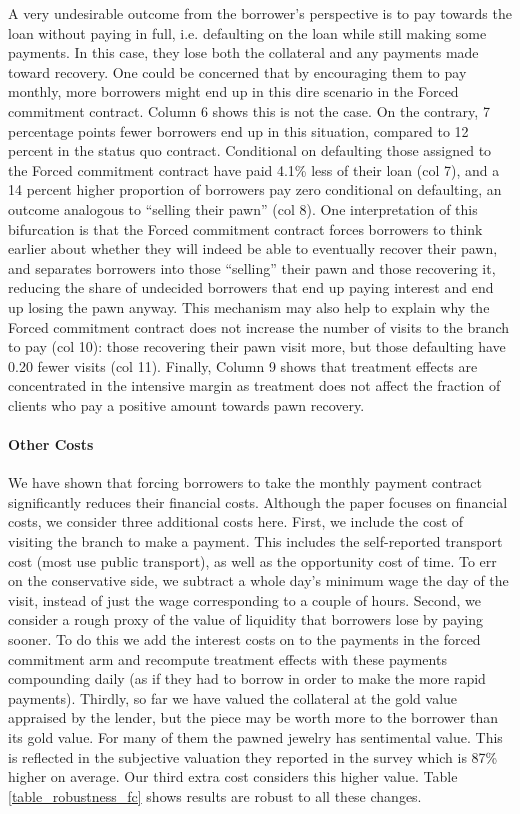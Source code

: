 \documentclass[12pt, a4paper]{article}
\begin{document}
A very undesirable outcome from the borrower's perspective is to pay towards the loan without paying in full, i.e. defaulting on the loan while still making some payments. In this case, they lose both the collateral and any payments made toward recovery. One could be concerned that by encouraging them to pay monthly, more borrowers might end up in this dire scenario in the Forced commitment contract. Column 6 shows this is not the case. On the contrary, 7 percentage points fewer borrowers end up in this situation, compared to 12 percent in the status quo contract. Conditional on defaulting those assigned to the Forced commitment contract have paid 4.1\% less of their loan (col 7), and a 14 percent higher proportion of borrowers pay zero conditional on defaulting, an outcome analogous to
``selling their pawn'' (col 8). One interpretation of this bifurcation is that the Forced commitment contract forces borrowers to think earlier about whether they will indeed be able to eventually recover their pawn, and separates borrowers into those ``selling'' their pawn and those recovering it, reducing the share of undecided borrowers that end up paying interest and end up losing the pawn anyway. This mechanism may also help to explain why the Forced commitment contract does not increase the number of visits to the branch to pay (col 10): those recovering their pawn visit more, but those defaulting have 0.20 fewer visits (col 11). Finally, Column 9 shows that treatment effects are concentrated in the intensive margin as treatment does not affect the fraction of clients who pay a positive amount towards pawn recovery.



\paragraph*{Other Costs} We have shown that forcing borrowers to take the monthly payment contract significantly reduces their financial costs. Although the paper focuses on financial costs, we consider three additional costs here. First, we include the cost of visiting the branch to make a payment. This includes the self-reported transport cost (most use public transport), as well as the opportunity cost of time. To err on the conservative side, we subtract a whole day's minimum wage the day of the visit, instead of just the wage corresponding to a couple of hours. Second, we consider a rough proxy of the value of liquidity that borrowers lose by paying sooner. To do this we add the interest costs on to the payments in the forced commitment arm and recompute treatment effects with these payments compounding daily (as if they had to borrow in order to make the more rapid payments). Thirdly, so far we have valued the collateral at the gold value appraised by the lender, but the piece may be worth more to the borrower than its gold value.  For many of them the pawned jewelry has sentimental value. This is reflected in the subjective valuation they reported in the survey which is 87\% higher on average. Our third extra cost considers this higher value. Table \ref{table_robustness_fc} shows results are robust to all these changes. 
\end{document}
